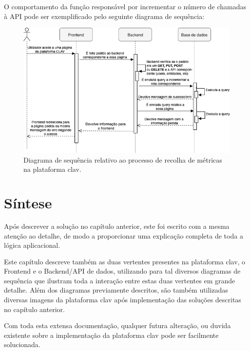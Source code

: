 O comportamento da função responsável por incrementar o número de chamadas à API pode ser exemplificado pelo seguinte diagrama de sequência:

\begin{figure}[H]
    \centering
    \includegraphics[width=\textwidth]{img/diagramas/sequencia/DiagramasSequencia-Metrica.png}
    \caption{Diagrama de sequência relativo ao processo de recolha de métricas na plataforma \gls{clav}.}
    \label{fig:diagramaSequenciaMetrica}
\end{figure}

\vspace{-8mm}
\section{Síntese}
\vspace{-4mm}
Após descrever a solução no capítulo anterior, este foi escrito com a mesma atenção ao detalhe, de modo a proporcionar uma explicação completa de toda a lógica aplicacional.

Este capítulo descreve também as duas vertentes presentes na plataforma \gls{clav}, o Frontend e o Backend/API de dados, utilizando para tal diversos diagramas de sequência que ilustram toda a interação entre estas duas vertentes em grande detalhe. Além dos diagramas previamente descritos, são também utilizadas diversas imagens da plataforma \gls{clav} após implementação das soluções descritas no capítulo anterior.

Com toda esta extensa documentação, qualquer futura alteração, ou duvida existente sobre a implementação da plataforma \gls{clav} pode ser facilmente solucionada.